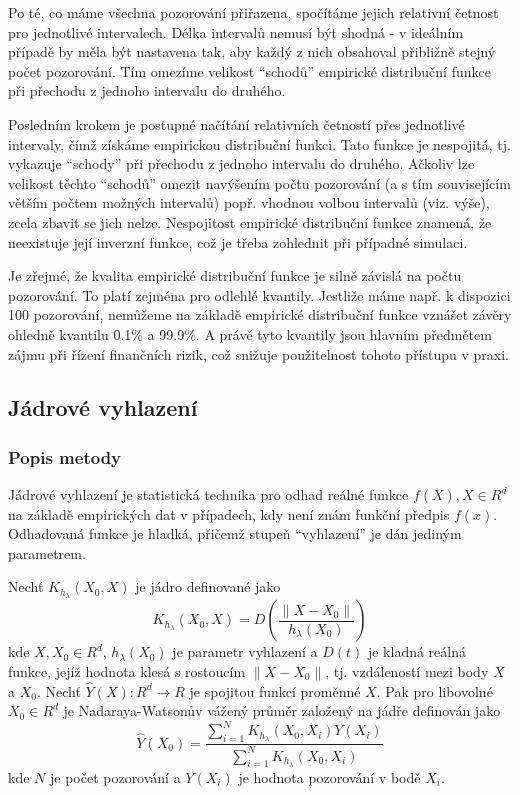 Po té, co máme všechna pozorování přiřazena, spočítáme jejich relativní četnost pro jednotlivé intervalech. Délka intervalů nemusí být shodná - v ideálním případě by měla být nastavena tak, aby každý z nich obsahoval přibližně stejný počet pozorování. Tím omezíme velikost ``schodů'' empirické distribuční funkce při přechodu z jednoho intervalu do druhého.

Posledním krokem je postupné načítání relativních četností přes jednotlivé intervaly, čímž získáme empirickou distribuční funkci. Tato funkce je nespojitá, tj. vykazuje ``schody'' při přechodu z jednoho intervalu do druhého. Ačkoliv lze velikost těchto ``schodů'' omezit navýšením počtu pozorování (a s tím souvisejícím větším počtem možných intervalů) popř. vhodnou volbou intervalů (viz. výše), zcela zbavit se jich nelze. Nespojitost empirické distribuční funkce znamená, že neexistuje její inverzní funkce, což je třeba zohlednit při případné simulaci.

Je zřejmé, že kvalita empirické distribuční funkce je silně závislá na počtu pozorování. To platí zejména pro odlehlé kvantily. Jestliže máme např. k dispozici 100 pozorování, nemůžeme na základě empirické distribuční funkce vznášet závěry ohledně kvantilu 0.1\% a 99.9\%. A právě tyto kvantily jsou hlavním předmětem zájmu při řízení finančních rizik, což snižuje použitelnost tohoto přístupu v praxi.

\subsection{Jádrové vyhlazení}

\subsubsection{Popis metody}

Jádrové vyhlazení je statistická technika pro odhad reálné funkce $f(X), X \in R^d$ na základě empirických dat v případech, kdy není znám funkční předpis $f(x)$. Odhadovaná funkce je hladká, přičemž stupeň ``vyhlazení'' je dán jediným parametrem.

Nechť $K_{h_{\lambda}}(X_0, X)$ je jádro definované jako
\begin{equation*}
K_{h_{\lambda}}(X_0, X) = D\left(\frac{\parallel X - X_0\parallel}{h_{\lambda}(X_0)} \right)
\end{equation*}
kde $X, X_0 \in R^d$, $h_{\lambda}(X_0)$ je parametr vyhlazení a $D(t)$ je kladná reálná funkce, jejíž hodnota klesá s rostoucím $\parallel X - X_0\parallel$, tj. vzdáleností mezi body $X$ a $X_0$.
Nechť $\hat{Y}(X): R^d \rightarrow R$ je spojitou funkcí proměnné $X$. Pak pro libovolné $X_0 \in R^d$ je Nadaraya-Watsonův vážený průměr založený na jádře definován jako
\begin{equation*}
\hat{Y}(X_0) = \frac{\sum_{i = 1}^N K_{h_{\lambda}}(X_0, X_i)Y(X_i)}{\sum_{i = 1}^N K_{h_{\lambda}}(X_0, X_i)}
\end{equation*}
kde $N$ je počet pozorování a $Y(X_i)$ je hodnota pozorování v bodě $X_i$.

